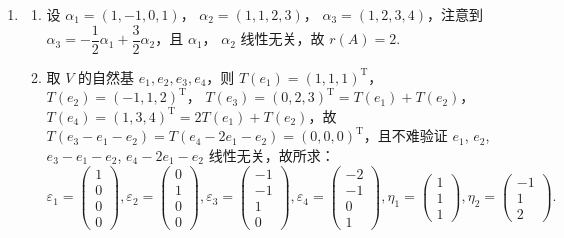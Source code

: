 \begin{enumerate}
    \item \begin{enumerate}
        \item 设 $\alpha_1=(1,-1,0,1)$， $\alpha_2=(1,1,2,3)$， $\alpha_3=(1,2,3,4)$，注意到 $\alpha_3=-\dfrac{1}{2}\alpha_1+\dfrac{3}{2}\alpha_2$，且 $\alpha_1$， $\alpha_2$ 线性无关，故 $r(A)=2$.
        \item 取 $V$ 的自然基 $e_1,e_2,e_3,e_4$，则 $T(e_1)=(1,1,1)^\mathrm{T}$， $T(e_2)=(-1,1,2)^\mathrm{T}$， $T(e_3)=(0,2,3)^\mathrm{T}=T(e_1)+T(e_2)$， $T(e_4)=(1,3,4)^\mathrm{T}=2T(e_1)+T(e_2)$，故 $T(e_3-e_1-e_2)=T(e_4-2e_1-e_2)=(0,0,0)^\mathrm{T}$，且不难验证 $e_1$, $e_2$, $e_3-e_1-e_2$, $e_4-2e_1-e_2$ 线性无关，故所求：
        \[
            \varepsilon_1=\begin{pmatrix}
                1 \\ 0 \\ 0 \\ 0
            \end{pmatrix}, \varepsilon_2=\begin{pmatrix}
                0 \\ 1 \\ 0 \\ 0
            \end{pmatrix}, \varepsilon_3=\begin{pmatrix}
                -1 \\ -1 \\ 1 \\ 0
            \end{pmatrix}, \varepsilon_4=\begin{pmatrix}
                -2 \\ -1 \\ 0 \\ 1
            \end{pmatrix}, \eta_1=\begin{pmatrix}
                1 \\ 1 \\ 1
            \end{pmatrix}, \eta_2=\begin{pmatrix}
                -1 \\ 1 \\ 2
            \end{pmatrix}.
        \]
    \end{enumerate}


\end{enumerate}
